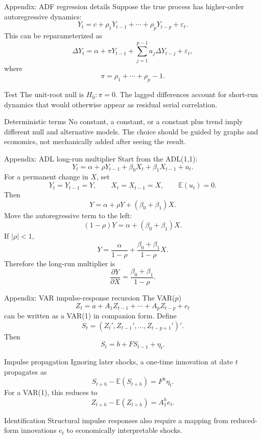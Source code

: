 \documentclass[10pt]{beamer}
\newcommand{\E}{\mathbb{E}}
\newcommand{\eps}{\varepsilon}
\begin{document}
\begin{frame}{Appendix: ADF regression details}
\label{app:adf-details}
\small
Suppose the true process has higher-order autoregressive dynamics:
\[
Y_t=c+\rho_1Y_{t-1}+\cdots+\rho_pY_{t-p}+\eps_t.
\]
This can be reparameterized as
\[
\Delta Y_t=\alpha+\pi Y_{t-1}
+\sum_{j=1}^{p-1}a_j\Delta Y_{t-j}+\eps_t,
\]
where
\[
\pi=\rho_1+\cdots+\rho_p-1.
\]

\begin{block}{Test}
The unit-root null is $H_0:\pi=0$. The lagged differences account for short-run dynamics that would otherwise appear as residual serial correlation.
\end{block}

\begin{alertblock}{Deterministic terms}
No constant, a constant, or a constant plus trend imply different null and alternative models. The choice should be guided by graphs and economics, not mechanically added after seeing the result.
\end{alertblock}

\hfill\hyperlink{slide:adf}{}
\end{frame}

\begin{frame}{Appendix: ADL long-run multiplier}
\label{app:adl-lrm}
\small
Start from the ADL(1,1):
\[
Y_t=\alpha+\rho Y_{t-1}+\beta_0X_t+\beta_1X_{t-1}+u_t.
\]
For a permanent change in $X$, set
\[
Y_t=Y_{t-1}=Y,
\qquad
X_t=X_{t-1}=X,
\qquad
\E(u_t)=0.
\]
Then
\[
Y=\alpha+\rho Y+(\beta_0+\beta_1)X.
\]
Move the autoregressive term to the left:
\[
(1-\rho)Y=\alpha+(\beta_0+\beta_1)X.
\]
If $|\rho|<1$,
\[
Y=\frac{\alpha}{1-\rho}
+\frac{\beta_0+\beta_1}{1-\rho}X.
\]
Therefore the long-run multiplier is
\[
\frac{\partial Y}{\partial X}
=\frac{\beta_0+\beta_1}{1-\rho}.
\]

\hfill\hyperlink{slide:adl_lrm}{}
\end{frame}

\begin{frame}{Appendix: VAR impulse-response recursion}
\label{app:var-irf}
\footnotesize
The VAR($p$)
\[
Z_t=a+A_1Z_{t-1}+\cdots+A_pZ_{t-p}+e_t
\]
can be written as a VAR(1) in companion form. Define
\[
S_t=(Z_t',Z_{t-1}',\ldots,Z_{t-p+1}')'.
\]
Then
\[
S_t=b+FS_{t-1}+\eta_t.
\]

\begin{block}{Impulse propagation}
Ignoring later shocks, a one-time innovation at date $t$ propagates as
\[
S_{t+h}-\E(S_{t+h})=F^h\eta_t.
\]
For a VAR(1), this reduces to
\[
Z_{t+h}-\E(Z_{t+h})=A_1^he_t.
\]
\end{block}

\begin{alertblock}{Identification}
Structural impulse responses also require a mapping from reduced-form innovations $e_t$ to economically interpretable shocks.
\end{alertblock}

\hfill\hyperlink{slide:var_irf}{}
\end{frame}
\end{document}
